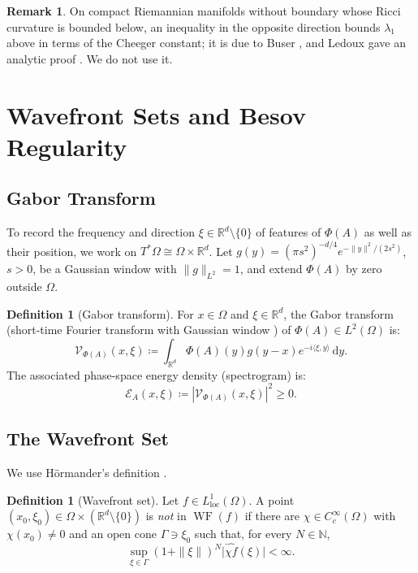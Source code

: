 \documentclass[11pt,a4paper,reqno]{amsart}
\theoremstyle{definition}
\newtheorem{definition}[theorem]{Definition}
\newtheorem{remark}[theorem]{Remark}
\numberwithin{equation}{section}
\newcommand{\R}{\mathbb{R}}
\newcommand{\dif}{\,\mathrm{d}}
\newcommand{\WF}{\operatorname{WF}}
\begin{document}
\begin{remark}
On compact Riemannian manifolds without boundary whose Ricci curvature is bounded below, an inequality in the opposite direction bounds $\lambda_1$ above in terms of the Cheeger constant; it is due to Buser \cite{buser1982note}, and Ledoux gave an analytic proof \cite{ledoux1994simple}. We do not use it.
\end{remark}

\section{Wavefront Sets and Besov Regularity}
\label{sec:microlocal}

\subsection{Gabor Transform}
To record the frequency and direction $\xi \in \R^d \setminus \{0\}$ of features of $\Phi(A)$ as well as their position, we work on $T^*\Omega \cong \Omega \times \R^d$. Let $g(y) = (\pi s^2)^{-d/4} e^{-\|y\|^2/(2s^2)}$, $s > 0$, be a Gaussian window with $\|g\|_{L^2} = 1$, and extend $\Phi(A)$ by zero outside $\Omega$.
\begin{definition}[Gabor transform]
For $x \in \Omega$ and $\xi \in \R^d$, the Gabor transform (short-time Fourier transform with Gaussian window \cite{grochenig2001foundations}) of $\Phi(A) \in L^2(\Omega)$ is:
\begin{equation}
    \mathcal{V}_{\Phi(A)}(x, \xi) \coloneqq \int_{\R^d} \Phi(A)(y) g(y - x) e^{-i \langle \xi, y \rangle} \dif y.
\end{equation}
The associated phase-space energy density (spectrogram) is:
\begin{equation}
    \mathcal{E}_A(x, \xi) \coloneqq \left| \mathcal{V}_{\Phi(A)}(x, \xi) \right|^2 \ge 0.
\end{equation}
\end{definition}

\subsection{The Wavefront Set}
We use H\"ormander's definition \cite[Sect.~8.1]{hormander2003analysis}.

\begin{definition}[Wavefront set]
Let $f \in L^1_{\mathrm{loc}}(\Omega)$. A point $(x_0, \xi_0) \in \Omega \times (\R^d \setminus \{0\})$ is \emph{not} in $\WF(f)$ if there are $\chi \in C_c^\infty(\Omega)$ with $\chi(x_0) \ne 0$ and an open cone $\Gamma \ni \xi_0$ such that, for every $N \in \mathbb{N}$,
\begin{equation}
    \sup_{\xi \in \Gamma} (1 + \|\xi\|)^N \big| \widehat{\chi f}(\xi) \big| < \infty.
\end{equation}
\end{definition}
\end{document}
